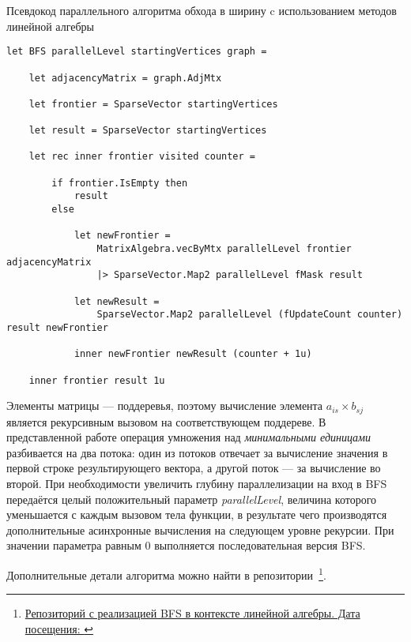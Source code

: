 \begin{algorithm}[h]
\caption{Псевдокод параллельного алгоритма обхода в ширину c использованием методов линейной алгебры}
\label{alg:bfs_example}
\begin{lstlisting}[language=pseudoFSharp]
let BFS parallelLevel startingVertices graph =

	let adjacencyMatrix = graph.AdjMtx

    let frontier = SparseVector startingVertices

    let result = SparseVector startingVertices

    let rec inner frontier visited counter =

        if frontier.IsEmpty then
            result
        else

            let newFrontier =
                MatrixAlgebra.vecByMtx parallelLevel frontier adjacencyMatrix
                |> SparseVector.Map2 parallelLevel fMask result

            let newResult =
                SparseVector.Map2 parallelLevel (fUpdateCount counter) result newFrontier

            inner newFrontier newResult (counter + 1u)

    inner frontier result 1u
\end{lstlisting}
\end{algorithm}

Элементы матрицы --- поддеревья, поэтому вычисление элемента $a_{is} \times b_{sj}$ является рекурсивным вызовом на соответствующем поддереве. В представленной работе операция умножения над \textit{минимальными единицами} разбивается на два потока: один из потоков отвечает за вычисление значения в первой строке результирующего вектора, а другой поток --- за вычисление во второй. При необходимости увеличить глубину параллелизации на вход в BFS передаётся целый положительный параметр \textit{parallelLevel}, величина которого уменьшается с каждым вызовом тела функции, в результате чего производятся дополнительные асинхронные вычисления на следующем уровне рекурсии. При значении параметра равным 0 выполняется последовательная версия BFS.

Дополнительные детали алгоритма можно найти в репозитории~\footnote{\href{https://github.com/artem-burashnikov}{Репозиторий с реализацией BFS в контексте линейной алгебры. Дата посещения: }}.